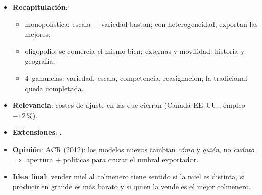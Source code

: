 \documentclass{article}
\begin{document}
\begin{columnas}
\begin{itemize}
\item \textbf{Recapitulación}:
  \begin{itemize}
  \item monopolística: escala + variedad bastan; con heterogeneidad, exportan las mejores;
  \item oligopolio: se comercia el mismo bien; externas y movilidad: historia y geografía;
  \item 4~ganancias: variedad, escala, competencia, reasignación; la tradicional queda completada.
  \end{itemize}
\item \textbf{Relevancia}: costes de ajuste en las que cierran (Canadá-EE.\,UU., empleo $-12$\,\%).
\item \textbf{Extensiones}:    .
\item \textbf{Opinión}: ACR (2012): los modelos nuevos cambian \emph{cómo} y \emph{quién}, no \emph{cuánto} $\Rightarrow$ apertura + políticas para cruzar el umbral exportador.
\item \textbf{Idea final}: vender miel al colmenero tiene sentido si la miel es distinta, si producir en grande es más barato y si quien la vende es el mejor colmenero.
\end{itemize}


\end{columnas}
\end{document}
